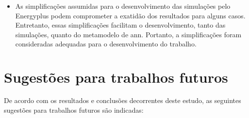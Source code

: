 \documentclass[brazil,hardcopy,openany]{ufscthesis} %
\begin{document}
\begin{itemize}
	\item As simplificações assumidas para o desenvolvimento das simulações pelo Energyplus podem comprometer a exatidão dos resultados para alguns casos. Entretanto, essas simplificações facilitam o desenvolvimento, tanto das simulações, quanto do metamodelo de \acrlong{ann}. Portanto, a simplificações foram consideradas adequadas para o desenvolvimento do trabalho.
	
\end{itemize}

\section{Sugestões para trabalhos futuros}

De acordo com os resultados e conclusões decorrentes deste estudo, as seguintes sugestões para trabalhos futuros são indicadas:
\end{document}
